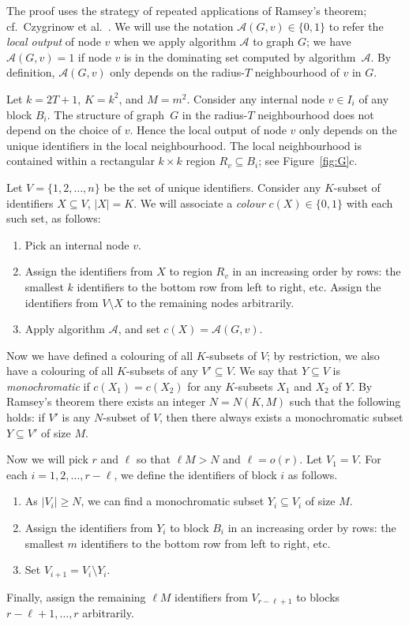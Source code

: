 \documentclass[11pt,a4paper]{article}
\theoremstyle{definition}
\newcommand{\A}{\mathcal{A}}
\begin{document}
The proof uses the strategy of repeated applications of Ramsey's theorem; cf.\ Czygrinow et al.~\cite[Lemma~4]{czygrinow08fast}. We will use the notation $\A(G,v) \in \{0,1\}$ to refer the \emph{local output} of node $v$ when we apply algorithm $\A$ to graph $G$; we have $\A(G,v) = 1$ if node $v$ is in the dominating set computed by algorithm~$\A$. By definition, $\A(G,v)$ only depends on the radius-$T$ neighbourhood of $v$ in $G$.

Let $k = 2T+1$, $K = k^2$, and $M = m^2$. Consider any internal node $v \in I_i$ of any block $B_i$. The structure of graph~$G$ in the radius-$T$ neighbourhood does not depend on the choice of $v$. Hence the local output of node $v$ only depends on the unique identifiers in the local neighbourhood. The local neighbourhood is contained within a rectangular $k \times k$ region $R_v \subseteq B_i$; see Figure~\ref{fig:G}c.

Let $V = \{1,2,\dotsc,n\}$ be the set of unique identifiers. Consider any $K$-subset of identifiers $X \subseteq V$, $|X| = K$. We will associate a \emph{colour} $c(X) \in \{0,1\}$ with each such set, as follows:
\begin{enumerate}[noitemsep]
    \item Pick an internal node $v$.
    \item Assign the identifiers from $X$ to region $R_v$ in an increasing order by rows: the smallest $k$ identifiers to the bottom row from left to right, etc. Assign the identifiers from $V \setminus X$ to the remaining nodes arbitrarily.
    \item Apply algorithm $\A$, and set $c(X) = \A(G,v)$.
\end{enumerate}

Now we have defined a colouring of all $K$-subsets of $V$; by restriction, we also have a colouring of all $K$-subsets of any $V' \subseteq V$. We say that $Y \subseteq V$ is \emph{monochromatic} if $c(X_1) = c(X_2)$ for any $K$-subsets $X_1$ and $X_2$ of $Y$. By Ramsey's theorem \cite{ramsey30problem} there exists an integer $N = N(K,M)$ such that the following holds: if $V'$ is any $N$-subset of $V$, then there always exists a monochromatic subset $Y \subseteq V'$ of size $M$.

Now we will pick $r$ and $\ell$ so that $\ell M > N$ and $\ell = o(r)$. Let $V_1 = V$. For each $i = 1, 2, \dotsc, r-\ell$, we define the identifiers of block $i$ as follows.
\begin{enumerate}[noitemsep]
    \item As $|V_i| \ge N$, we can find a monochromatic subset $Y_i \subseteq V_i$ of size $M$.
    \item Assign the identifiers from $Y_i$ to block $B_i$ in an increasing order by rows: the smallest $m$ identifiers to the bottom row from left to right, etc.
    \item Set $V_{i+1} = V_i \setminus Y_i$.
\end{enumerate}
Finally, assign the remaining $\ell M$ identifiers from $V_{r-\ell+1}$ to blocks $r-\ell+1, \dotsc, r$ arbitrarily.
\end{document}
